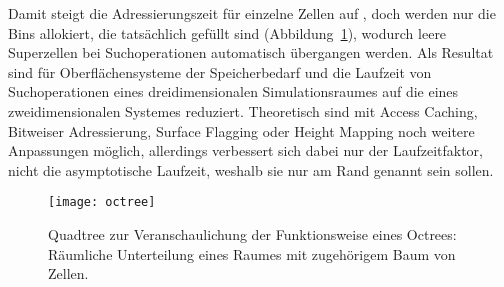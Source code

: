Damit steigt die Adressierungszeit für einzelne Zellen auf , doch werden nur die Bins allokiert, die tatsächlich gefüllt sind (Abbildung~\ref{fig:octree}), wodurch leere Superzellen bei Suchoperationen automatisch übergangen werden.
Als Resultat sind für Oberflächensysteme der Speicherbedarf und die Laufzeit von Suchoperationen eines dreidimensionalen Simulationsraumes auf die eines zweidimensionalen Systemes reduziert.
Theoretisch sind mit Access Caching, Bitweiser Adressierung, Surface Flagging oder Height Mapping noch weitere Anpassungen möglich, allerdings verbessert sich dabei nur der Laufzeitfaktor, nicht die asymptotische Laufzeit, weshalb sie nur am Rand genannt sein sollen.


\begin{figure}
  \centering
  \texttt{[image: octree]}
  \caption[Veranschaulichung der Funktionsweise eines Octrees]{
    Quadtree zur Veranschaulichung der Funktionsweise eines Octrees:\\
    Räumliche Unterteilung eines Raumes mit zugehörigem Baum von Zellen.
  }
  \label{fig:octree}
\end{figure}

